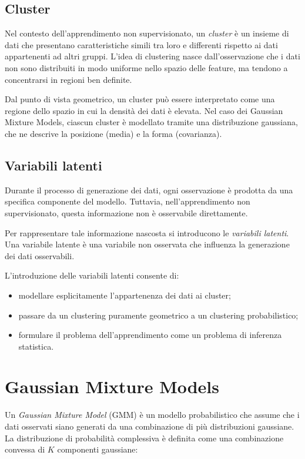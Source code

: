 \documentclass[a4paper,12pt]{report}
\begin{document}
\subsection{Cluster}

Nel contesto dell’apprendimento non supervisionato, un \emph{cluster} è un insieme di dati che presentano caratteristiche simili tra loro e differenti rispetto ai dati appartenenti ad altri gruppi.
L’idea di clustering nasce dall’osservazione che i dati non sono distribuiti in modo uniforme nello spazio delle feature, ma tendono a concentrarsi in regioni ben definite.

Dal punto di vista geometrico, un cluster può essere interpretato come una regione dello spazio in cui la densità dei dati è elevata.
Nel caso dei Gaussian Mixture Models, ciascun cluster è modellato tramite una distribuzione gaussiana, che ne descrive la posizione (media) e la forma (covarianza).

\subsection{Variabili latenti}

Durante il processo di generazione dei dati, ogni osservazione è prodotta da una specifica componente del modello.
Tuttavia, nell’apprendimento non supervisionato, questa informazione non è osservabile direttamente.

Per rappresentare tale informazione nascosta si introducono le \emph{variabili latenti}.
Una variabile latente è una variabile non osservata che influenza la generazione dei dati osservabili.

L’introduzione delle variabili latenti consente di:
\begin{itemize}
    \item modellare esplicitamente l’appartenenza dei dati ai cluster;
    \item passare da un clustering puramente geometrico a un clustering probabilistico;
    \item formulare il problema dell’apprendimento come un problema di inferenza statistica.
\end{itemize}

\section{Gaussian Mixture Models}

Un \emph{Gaussian Mixture Model} (GMM) è un modello probabilistico che assume che i dati osservati siano generati da una combinazione di più distribuzioni gaussiane.
La distribuzione di probabilità complessiva è definita come una combinazione convessa di $K$ componenti gaussiane:
\end{document}
